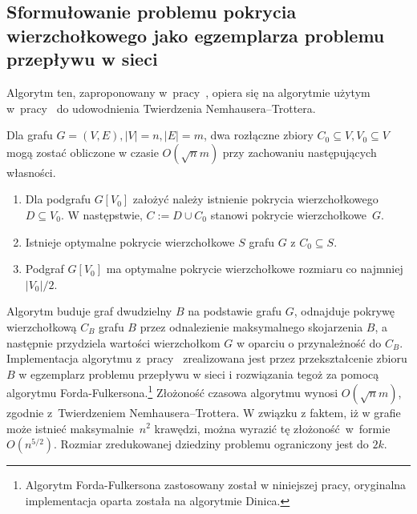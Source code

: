 \subsection{Sformułowanie problemu pokrycia wierzchołkowego jako egzemplarza problemu przepływu w sieci}\label{Kernelization_network_flow}
Algorytm ten, zaproponowany w~pracy~\cite{KernelizationAlgorithms04}, opiera się na
algorytmie użytym w~pracy~\cite{Niedermeier02} do udowodnienia Twierdzenia
Nemhausera--Trottera.

\begin{theorem}
  Dla grafu $G=(V,E), |V|=n, |E|=m$, dwa rozłączne zbiory $C_0 \subseteq V,
  V_0 \subseteq V$ mogą zostać obliczone w czasie $O(\sqrt{n}m)$ przy zachowaniu
  następujących własności.
  \begin{enumerate}
    \item Dla podgrafu $G[V_0]$ założyć należy istnienie pokrycia wierzchołkowego $D \subseteq
      V_0$. W następstwie, $C := D \cup C_0$ stanowi pokrycie wierzchołkowe~$G$.
    \item Istnieje optymalne pokrycie wierzchołkowe $S$ grafu $G$ z $C_0
      \subseteq S$.
    \item Podgraf $G[V_0]$ ma optymalne pokrycie wierzchołkowe rozmiaru co
      najmniej $|V_0|/2$. 
  \end{enumerate}
\end{theorem}

Algorytm buduje graf dwudzielny $B$ na podstawie grafu $G$, odnajduje pokrywę
wierzchołkową $C_B$ grafu $B$ przez odnalezienie maksymalnego skojarzenia $B$,
a następnie przydziela wartości wierzchołkom $G$ w oparciu o przynależność do
$C_B$.
Implementacja algorytmu z~pracy~\cite{Niedermeier02} zrealizowana jest przez
przekształcenie zbioru $B$ w egzemplarz problemu przepływu w sieci i rozwiązania tegoż
za pomocą algorytmu Forda-Fulkersona.\footnote{Algorytm Forda-Fulkersona
  zastosowany został w niniejszej pracy, oryginalna implementacja oparta została
na algorytmie Dinica.}
Złożoność czasowa algorytmu wynosi $O(\sqrt{n}m)$, zgodnie z~Twierdzeniem
Nemhausera--Trottera. 
W związku z faktem, iż w grafie może istnieć maksymalnie~$n^2$ krawędzi, można
wyrazić tę złożoność~w~formie $O(n^{5/2})$.
Rozmiar zredukowanej dziedziny problemu ograniczony jest do $2k$.

